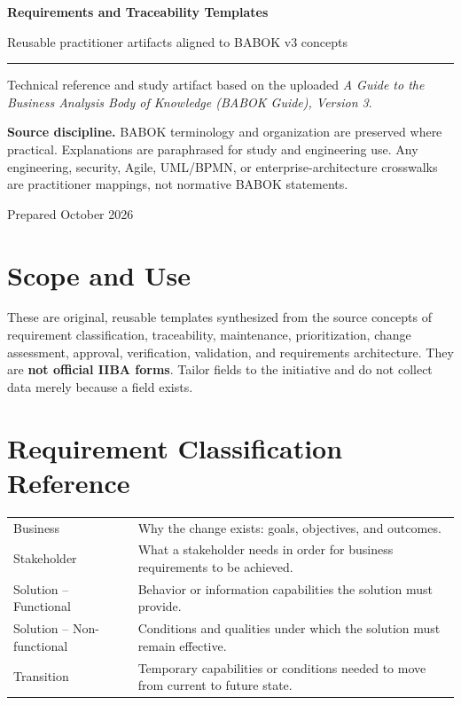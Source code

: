 \documentclass[11pt]{article}
\begin{document}
\begin{titlepage}
\centering
\vspace*{1.15in}
{\Huge\bfseries\color{BANavy} Requirements and Traceability Templates\par}
\vspace{0.35in}
{\Large\color{BAOrange} Reusable practitioner artifacts aligned to BABOK v3 concepts\par}
\vspace{0.55in}
\rule{0.78\textwidth}{1.2pt}\par
\vspace{0.35in}
{\large Technical reference and study artifact based on the uploaded \emph{A Guide to the Business Analysis Body of Knowledge (BABOK Guide), Version 3}.\par}
\vfill
\begin{keybox}
\textbf{Source discipline.} BABOK terminology and organization are preserved where practical. Explanations are paraphrased for study and engineering use. Any engineering, security, Agile, UML/BPMN, or enterprise-architecture crosswalks are practitioner mappings, not normative BABOK statements.
\end{keybox}
\vspace{0.35in}
{\small Prepared October 2026\par}
\end{titlepage}
\tableofcontents
\newpage
\section{Scope and Use}
These are original, reusable templates synthesized from the source concepts of requirement classification, traceability, maintenance, prioritization, change assessment, approval, verification, validation, and requirements architecture. They are \textbf{not official IIBA forms}. Tailor fields to the initiative and do not collect data merely because a field exists.

\section{Requirement Classification Reference}
\begin{longtable}{L{0.20\textwidth} L{0.68\textwidth}}
\toprule
Business & Why the change exists: goals, objectives, and outcomes.\\
Stakeholder & What a stakeholder needs in order for business requirements to be achieved.\\
Solution -- Functional & Behavior or information capabilities the solution must provide.\\
Solution -- Non-functional & Conditions and qualities under which the solution must remain effective.\\
Transition & Temporary capabilities or conditions needed to move from current to future state.\\
\bottomrule
\end{longtable}
\end{document}

